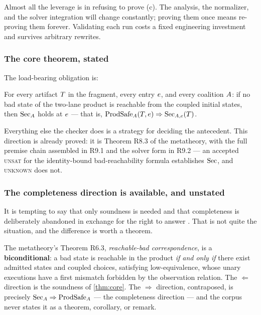 Almost all the leverage is in refusing to prove (c). The analysis, the
normalizer, and the solver integration will change constantly; proving them once
means re-proving them forever. Validating each run costs a fixed engineering
investment and survives arbitrary rewrites.

\subsubsection*{The core theorem, stated}

The load-bearing obligation is:

\begin{theorem}
\label{thm:core}
For every artifact $T$ in the fragment, every entry $e$, and every
coalition $A$: if no bad state of the two-lane product is reachable from the
coupled initial states, then $\mathrm{Sec}_A$ holds at $e$ --- that is,
$\mathrm{ProdSafe}_A(T,e) \Rightarrow \mathrm{Sec}_{A,e}(T)$.
\end{theorem}

Everything else the checker does is a strategy for deciding the antecedent. This
direction is already proved: it is Theorem R8.3 of the metatheory, with the full
premise chain assembled in R9.1 and the solver form in R9.2 --- an accepted
\textsc{unsat} for the identity-bound bad-reachability formula establishes
$\mathrm{Sec}$, and \textsc{unknown} does not.

\subsubsection*{The completeness direction is available, and unstated}

It is tempting to say that only soundness is needed and that completeness is
deliberately abandoned in exchange for the right to answer \Unknown{}. That is
not quite the situation, and the difference is worth a theorem.

The metatheory's Theorem R6.3, \emph{reachable-bad correspondence}, is a
\textbf{biconditional}: a bad state is reachable in the product \emph{if and only
if} there exist admitted states and coupled choices, satisfying low-equivalence,
whose unary executions have a first mismatch forbidden by the observation
relation. The $\Leftarrow$ direction is the soundness of
\cref{thm:core}. The $\Rightarrow$ direction, contraposed, is precisely
$\mathrm{Sec}_A \Rightarrow \mathrm{ProdSafe}_A$ --- the completeness direction --- and
the corpus never states it as a theorem, corollary, or remark.

